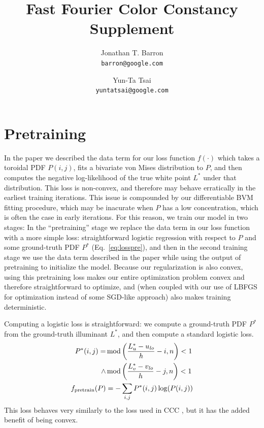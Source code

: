 \documentclass[10pt,twocolumn,letterpaper]{article}
\newcommand{\binwidth}{h}
\begin{document}
\title{Fast Fourier Color Constancy \\ Supplement}

\author{
Jonathan T. Barron\\
{\tt\small barron@google.com}
\and
Yun-Ta Tsai\\
{\tt\small yuntatsai@google.com}
}
\maketitle


\section{Pretraining}

In the paper we described the data term for our loss function $f(\cdot)$ which
takes a toroidal PDF $P(i,j)$, fits a bivariate von Mises
distribution to $P$, and then computes the negative log-likelihood
of the true white point $L^*$ under that distribution.
This loss is non-convex, and therefore may behave erratically
in the earliest training iterations. This issue is compounded by our
differentiable BVM fitting procedure, which may be inacurate when $P$ has
a low concentration, which is often the case in early iterations.
For this reason, we train our model in two stages:
In the ``pretraining'' stage we replace the data term in our loss function
with a more simple loss: straightforward logistic regression with respect to
$P$ and some ground-truth PDF $P^*$ (Eq.~\ref{eq:losspre}), and then
in the second training stage we use the data term described in the paper while
using the output of pretraining to initialize the model.
Because our regularization is also convex, using this pretraining loss makes
our entire optimization problem convex and therefore straightforward to
optimize, and (when coupled with our use of LBFGS for optimization instead
of some SGD-like approach) also makes training deterministic.

Computing a logistic loss is straightforward: we compute a ground-truth PDF
$P^*$ from the ground-truth illuminant $L^*$, and then compute a standard
logistic loss.
\begin{align}
P^*(i,j) =& \operatorname{mod} \left( { L_u^* - u_\mathit{lo} \over \binwidth} - i, n \right) < 1 \\
\wedge& \operatorname{mod} \left( { L_v^* - v_\mathit{lo} \over \binwidth} - j, n \right) < 1 \nonumber \\
f_{\mathrm{pretrain}}(P) &= -\sum_{i,j} P^*(i,j) \log(P(i,j)) \label{eq:losspre}
\end{align}
This loss behaves very similarly to the loss used in CCC \cite{BarronICCV2015},
but it has the added benefit of being convex.
\end{document}
